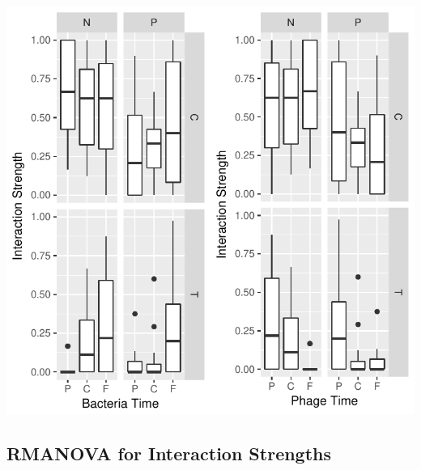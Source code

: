 \documentclass[]{article}
\begin{document}
\includegraphics{analysis_ecoevostoich_files/figure-latex/unnamed-chunk-20-1.pdf}

\newpage

\subsection{RMANOVA for Interaction
Strengths}\label{rmanova-for-interaction-strengths}
\end{document}

